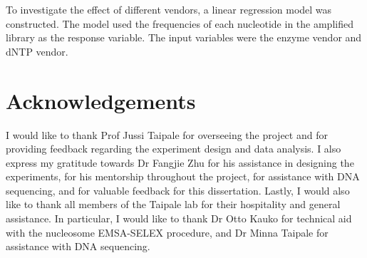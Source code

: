 \documentclass[parskip=full, numbers=noenddot]{scrbook}
\begin{document}
To investigate the effect of different vendors, a linear regression model was constructed.  The model used the frequencies of each nucleotide in the amplified library as the response variable.  The input variables were the enzyme vendor and dNTP vendor.

\backmatter

\chapter{Acknowledgements}
\label{ch:ack}

I would like to thank Prof Jussi Taipale for overseeing the project and for providing feedback regarding the experiment design and data analysis.  I also express my gratitude towards Dr Fangjie Zhu for his assistance in designing the experiments, for his mentorship throughout the project, for assistance with DNA sequencing, and for valuable feedback for this dissertation.  Lastly, I would also like to thank all members of the Taipale lab for their hospitality and general assistance.  In particular, I would like to thank Dr Otto Kauko for technical aid with the nucleosome EMSA-SELEX procedure, and Dr Minna Taipale for assistance with DNA sequencing.

\printbibliography
\end{document}
